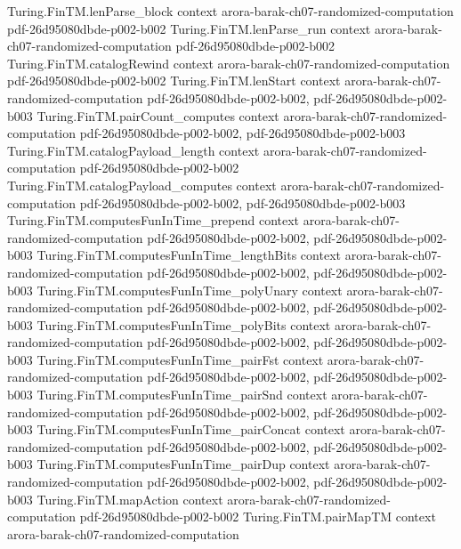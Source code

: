 \begin{theorem}
\proofstep
  {Turing.FinTM.lenParse_block}
  {context}
  {arora-barak-ch07-randomized-computation}
  {pdf-26d95080dbde-p002-b002}
\proofstep
  {Turing.FinTM.lenParse_run}
  {context}
  {arora-barak-ch07-randomized-computation}
  {pdf-26d95080dbde-p002-b002}
\proofstep
  {Turing.FinTM.catalogRewind}
  {context}
  {arora-barak-ch07-randomized-computation}
  {pdf-26d95080dbde-p002-b002}
\proofstep
  {Turing.FinTM.lenStart}
  {context}
  {arora-barak-ch07-randomized-computation}
  {pdf-26d95080dbde-p002-b002,
    pdf-26d95080dbde-p002-b003}
\proofstep
  {Turing.FinTM.pairCount_computes}
  {context}
  {arora-barak-ch07-randomized-computation}
  {pdf-26d95080dbde-p002-b002,
    pdf-26d95080dbde-p002-b003}
\proofstep
  {Turing.FinTM.catalogPayload_length}
  {context}
  {arora-barak-ch07-randomized-computation}
  {pdf-26d95080dbde-p002-b002}
\proofstep
  {Turing.FinTM.catalogPayload_computes}
  {context}
  {arora-barak-ch07-randomized-computation}
  {pdf-26d95080dbde-p002-b002,
    pdf-26d95080dbde-p002-b003}
\proofstep
  {Turing.FinTM.computesFunInTime_prepend}
  {context}
  {arora-barak-ch07-randomized-computation}
  {pdf-26d95080dbde-p002-b002,
    pdf-26d95080dbde-p002-b003}
\proofstep
  {Turing.FinTM.computesFunInTime_lengthBits}
  {context}
  {arora-barak-ch07-randomized-computation}
  {pdf-26d95080dbde-p002-b002,
    pdf-26d95080dbde-p002-b003}
\proofstep
  {Turing.FinTM.computesFunInTime_polyUnary}
  {context}
  {arora-barak-ch07-randomized-computation}
  {pdf-26d95080dbde-p002-b002,
    pdf-26d95080dbde-p002-b003}
\proofstep
  {Turing.FinTM.computesFunInTime_polyBits}
  {context}
  {arora-barak-ch07-randomized-computation}
  {pdf-26d95080dbde-p002-b002,
    pdf-26d95080dbde-p002-b003}
\proofstep
  {Turing.FinTM.computesFunInTime_pairFst}
  {context}
  {arora-barak-ch07-randomized-computation}
  {pdf-26d95080dbde-p002-b002,
    pdf-26d95080dbde-p002-b003}
\proofstep
  {Turing.FinTM.computesFunInTime_pairSnd}
  {context}
  {arora-barak-ch07-randomized-computation}
  {pdf-26d95080dbde-p002-b002,
    pdf-26d95080dbde-p002-b003}
\proofstep
  {Turing.FinTM.computesFunInTime_pairConcat}
  {context}
  {arora-barak-ch07-randomized-computation}
  {pdf-26d95080dbde-p002-b002,
    pdf-26d95080dbde-p002-b003}
\proofstep
  {Turing.FinTM.computesFunInTime_pairDup}
  {context}
  {arora-barak-ch07-randomized-computation}
  {pdf-26d95080dbde-p002-b002,
    pdf-26d95080dbde-p002-b003}
\proofstep
  {Turing.FinTM.mapAction}
  {context}
  {arora-barak-ch07-randomized-computation}
  {pdf-26d95080dbde-p002-b002}
\proofstep
  {Turing.FinTM.pairMapTM}
  {context}
  {arora-barak-ch07-randomized-computation}

\end{theorem}
